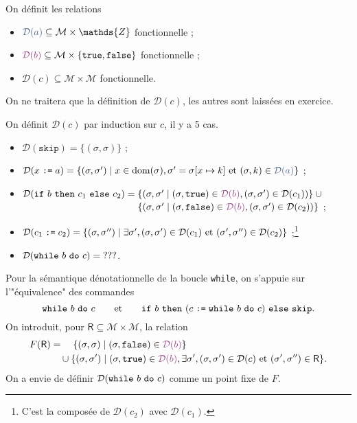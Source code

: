 \documentclass[../main]{subfiles}
\begin{document}
  On définit les relations
  \begin{itemize}
    \item ${\color{deepblue}\mathcal{D}(a)} \subseteq \mathcal{M} \times \mathds{Z}$ fonctionnelle ;
    \item ${\color{deeppurple}\mathcal{D}(b)} \subseteq \mathcal{M} \times \{\mathtt{true},\mathtt{false}\}$ fonctionnelle ;
    \item $\mathcal{D}(c) \subseteq \mathcal{M} \times \mathcal{M}$ fonctionnelle.
  \end{itemize}
  On ne traitera que la définition de $\mathcal{D}(c)$, les autres sont laissées en exercice.

  On définit $\mathcal{D}(c)$ par induction sur $c$, il y a 5 cas.
  \begin{itemize}
    \item $\mathcal{D}(\mathtt{skip}) = \{(\sigma, \sigma)\}$ ;
    \item \small$\mathcal{D}(x \ceq a) = \{(\sigma, \sigma')  \mid x \in \mathrm{dom}(\sigma), \sigma' = \sigma[x \mapsto k] \text{ et  } (\sigma, k) \in {\color{deepblue}\mathcal{D}(a)}\}$ ;
    \item \footnotesize $\mathcal{D}(\ifte b {c_1} {c_2}) = \{(\sigma, \sigma'  \mid (\sigma, \mathtt{true}) \in {\color{deeppurple}\mathcal{D}(b)}, (\sigma, \sigma') \in \mathcal{D}(c_1))\}  \cup {}$\\
        $\phantom{\mathcal{D}(\ifte b {c_1} {c_2}) ={}}\{(\sigma, \sigma'  \mid (\sigma, \mathtt{false}) \in {\color{deeppurple}\mathcal{D}(b)}, (\sigma, \sigma') \in \mathcal{D}(c_2))\}$ ;
        \item $\mathcal{D}(c_1 \mathrel{\texttt{:=}} c_2) = \{(\sigma, \sigma'')  \mid \exists \sigma', (\sigma, \sigma') \in \mathcal{D}(c_1) \text{ et } (\sigma', \sigma'') \in \mathcal{D}(c_2)\}$ ;\footnote{C'est la composée de $\mathcal{D}(c_2)$ avec $\mathcal{D}(c_1)$.}\showfootnote
        \item $\mathcal{D}(\texttt{while}\ b\ \texttt{do}\ c) = {???}$.
  \end{itemize}

  Pour la sémantique dénotationnelle de la boucle \texttt{while}, 
  on s'appuie sur l'"équivalence" des commandes \[
    \texttt{while}\ b\ \texttt{do}\ c \quad\quad\text{et}\quad\quad \texttt{if}\ b\ \texttt{then}\ (c \mathrel{\texttt{:=}} \texttt{while}\ b\ \texttt{do}\ c)\ \texttt{else}\ \texttt{skip}.
  \]
  On introduit, pour $\mathsf{R} \subseteq \mathcal{M} \times \mathcal{M}$, la relation
  \begin{align*}
    F(\mathsf{R}) &{}=\quad \{(\sigma,\sigma)  \mid (\sigma, \mathtt{false}) \in {\color{deeppurple}\mathcal{D}(b)}\} \\
    &\quad{}\cup \{(\sigma, \sigma')  \mid (\sigma, \mathtt{true}) \in {\color{deeppurple}\mathcal{D}(b)}, \exists \sigma', (\sigma, \sigma') \in \mathcal{D}(c) \text{ et } (\sigma', \sigma'') \in \mathsf{R} \} 
  .\end{align*}
  On a envie de définir $\mathcal{D}(\texttt{while}\ b\ \texttt{do}\ c)$ comme un point fixe de $F$.
\end{document}
